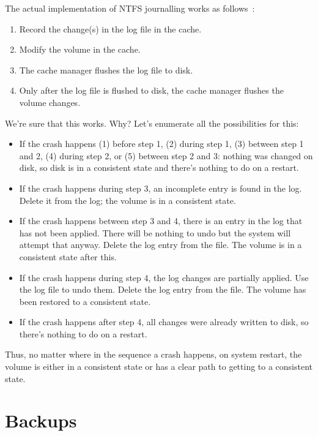 The actual implementation of NTFS journalling works as follows~\cite{russ}:

\begin{enumerate}
	\item Record the change(s) in the log file in the cache.
	\item Modify the volume in the cache.
	\item The cache manager flushes the log file to disk.
	\item Only after the log file is flushed to disk, the cache manager flushes the volume changes.
\end{enumerate}

We're sure that this works. Why? Let's enumerate all the possibilities for this:

\begin{itemize}
	\item If the crash happens (1) before step 1, (2) during step 1, (3) between step 1 and 2, (4) during step 2, or (5) between step 2 and 3: nothing was changed on disk, so disk is in a consistent state and there's nothing to do on a restart.
	
	\item If the crash happens during step 3, an incomplete entry is found in the log. Delete it from the log; the volume is in a consistent state.
	
	\item If the crash happens between step 3 and 4, there is an entry in the log that has not been applied. There will be nothing to undo but the system will attempt that anyway. Delete the log entry from the file. The volume is in a consistent state after this.
	
	\item If the crash happens during step 4, the log changes are partially applied. Use the log file to undo them. Delete the log entry from the file. The volume has been restored to a consistent state.
	
	\item If the crash happens after step 4, all changes were already written to disk, so there's nothing to do on a restart.
\end{itemize}

Thus, no matter where in the sequence a crash happens, on system restart, the volume is either in a consistent state or has a clear path to getting to a consistent state.

\section*{Backups}


